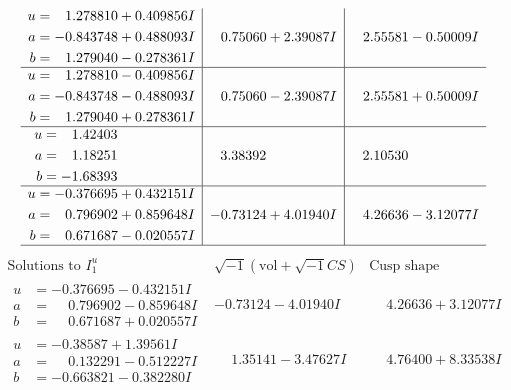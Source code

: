 \documentclass[1p]{elsarticle_modified}
\theoremstyle{definition}
\newcommand{\I}{\sqrt{-1}}
\begin{document}
$$\begin{array}{c|c|c}
\begin{aligned}
u &= \phantom{-}1.278810 + 0.409856 I \\
a &= -0.843748 + 0.488093 I \\
b &= \phantom{-}1.279040 - 0.278361 I\end{aligned}
 & \phantom{-}0.75060 + 2.39087 I & \phantom{-}2.55581 - 0.50009 I \\ \hline\begin{aligned}
u &= \phantom{-}1.278810 - 0.409856 I \\
a &= -0.843748 - 0.488093 I \\
b &= \phantom{-}1.279040 + 0.278361 I\end{aligned}
 & \phantom{-}0.75060 - 2.39087 I & \phantom{-}2.55581 + 0.50009 I \\ \hline\begin{aligned}
u &= \phantom{-}1.42403\phantom{ +0.000000I} \\
a &= \phantom{-}1.18251\phantom{ +0.000000I} \\
b &= -1.68393\phantom{ +0.000000I}\end{aligned}
 & \phantom{-}3.38392\phantom{ +0.000000I} & \phantom{-}2.10530\phantom{ +0.000000I} \\ \hline\begin{aligned}
u &= -0.376695 + 0.432151 I \\
a &= \phantom{-}0.796902 + 0.859648 I \\
b &= \phantom{-}0.671687 - 0.020557 I\end{aligned}
 & -0.73124 + 4.01940 I & \phantom{-}4.26636 - 3.12077 I\\
 \hline 
 \end{array}$$\newpage$$\begin{array}{c|c|c}  
\text{Solutions to }I^u_{1}& \I (\text{vol} + \sqrt{-1}CS) & \text{Cusp shape}\\
 \hline 
\begin{aligned}
u &= -0.376695 - 0.432151 I \\
a &= \phantom{-}0.796902 - 0.859648 I \\
b &= \phantom{-}0.671687 + 0.020557 I\end{aligned}
 & -0.73124 - 4.01940 I & \phantom{-}4.26636 + 3.12077 I \\ \hline\begin{aligned}
u &= -0.38587 + 1.39561 I \\
a &= \phantom{-}0.132291 - 0.512227 I \\
b &= -0.663821 - 0.382280 I\end{aligned}
 & \phantom{-}1.35141 - 3.47627 I & \phantom{-}4.76400 + 8.33538 I \\ \hline\begin{aligned}

\end{aligned}
\end{array}$$
\end{document}
